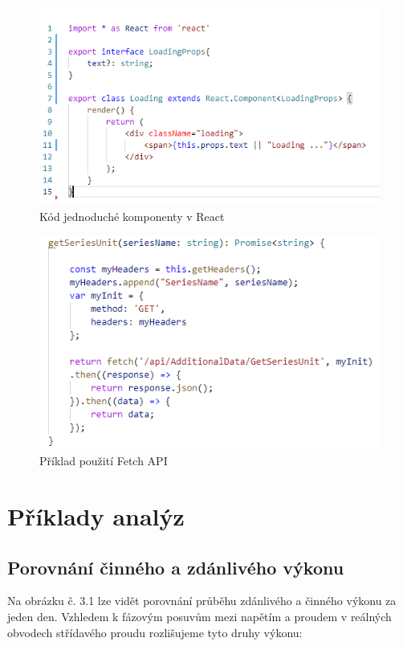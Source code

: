 \documentclass[FM,BP]{tulthesis}
\begin{document}
            \begin{figure}[h]
                \centering
                \includegraphics[scale=1]{pic/loadingComponentExample.PNG}
                \caption{Kód jednoduché komponenty v React} \label{Obrázek č. 5}
            \end{figure}
            \begin{figure}[h]
                \centering
                \includegraphics[scale=1]{pic/fetchexample.PNG}
                \caption{Příklad použití Fetch API} \label{Obrázek č. 7}
            \end{figure}

\chapter{Příklady analýz}
    \section{Porovnání činného a zdánlivého výkonu}
    Na obrázku č. 3.1 lze vidět porovnání průběhu zdánlivého a činného výkonu za jeden den.
    Vzhledem k fázovým posuvům mezi napětím a proudem v reálných obvodech střídavého proudu rozlišujeme tyto druhy výkonu:
\end{document}
